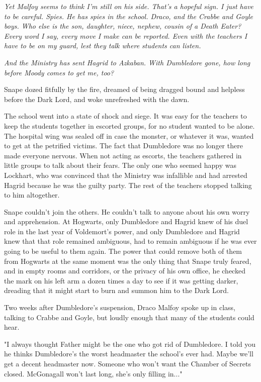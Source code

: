 \documentclass[a4paper,11pt]{article}
\begin{document}
\emph{Yet Malfoy seems to think I'm still on his side. That's a hopeful sign. I just have to be careful. Spies. He has spies in the school. Draco, and the Crabbe and Goyle boys. Who else is the son, daughter, niece, nephew, cousin of a Death Eater? Every word I say, every move I make can be reported. Even with the teachers I have to be on my guard, lest they talk where students can listen.}

\emph{And the Ministry has sent Hagrid to Azkaban. With Dumbledore gone, how long before Moody comes to get me, too?}

Snape dozed fitfully by the fire, dreamed of being dragged bound and helpless before the Dark Lord, and woke unrefreshed with the dawn.

The school went into a state of shock and siege. It was easy for the teachers to keep the students together in escorted groups, for no student wanted to be alone. The hospital wing was sealed off in case the monster, or whatever it was, wanted to get at the petrified victims. The fact that Dumbledore was no longer there made everyone nervous. When not acting as escorts, the teachers gathered in little groups to talk about their fears. The only one who seemed happy was Lockhart, who was convinced that the Ministry was infallible and had arrested Hagrid because he was the guilty party. The rest of the teachers stopped talking to him altogether.

Snape couldn't join the others. He couldn't talk to anyone about his own worry and apprehension. At Hogwarts, only Dumbledore and Hagrid knew of his duel role in the last year of Voldemort's power, and only Dumbledore and Hagrid knew that that role remained ambiguous, had to remain ambiguous if he was ever going to be useful to them again. The power that could remove both of them from Hogwarts at the same moment was the only thing that Snape truly feared, and in empty rooms and corridors, or the privacy of his own office, he checked the mark on his left arm a dozen times a day to see if it was getting darker, dreading that it might start to burn and summon him to the Dark Lord.

Two weeks after Dumbledore's suspension, Draco Malfoy spoke up in class, talking to Crabbe and Goyle, but loudly enough that many of the students could hear.

"I always thought Father might be the one who got rid of Dumbledore. I told you he thinks Dumbledore's the worst headmaster the school's ever had. Maybe we'll get a decent headmaster now. Someone who won't want the Chamber of Secrets closed. McGonagall won't last long, she's only filling in..."
\end{document}
